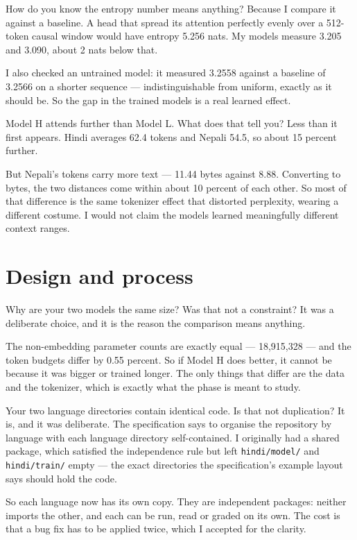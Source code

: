 \documentclass[11pt]{report}
\newcommand{\p}[1]{\texttt{#1}}
\begin{document}
\begin{qabox}{How do you know the entropy number means anything?}
Because I compare it against a baseline. A head that spread its attention
perfectly evenly over a 512-token causal window would have entropy 5.256 nats. My
models measure 3.205 and 3.090, about 2 nats below that.

I also checked an untrained model: it measured 3.2558 against a baseline of
3.2566 on a shorter sequence --- indistinguishable from uniform, exactly as it
should be. So the gap in the trained models is a real learned effect.
\end{qabox}

\begin{qabox}{Model H attends further than Model L. What does that tell you?}
Less than it first appears. Hindi averages 62.4 tokens and Nepali 54.5, so about
15 percent further.

But Nepali's tokens carry more text --- 11.44 bytes against 8.88. Converting to
bytes, the two distances come within about 10 percent of each other. So most of
that difference is the same tokenizer effect that distorted perplexity, wearing a
different costume. I would not claim the models learned meaningfully different
context ranges.
\end{qabox}

\section{Design and process}

\begin{qabox}{Why are your two models the same size? Was that not a constraint?}
It was a deliberate choice, and it is the reason the comparison means anything.

The non-embedding parameter counts are exactly equal --- 18,915,328 --- and the
token budgets differ by 0.55 percent. So if Model H does better, it cannot be
because it was bigger or trained longer. The only things that differ are the data
and the tokenizer, which is exactly what the phase is meant to study.
\end{qabox}

\begin{qabox}{Your two language directories contain identical code. Is that not duplication?}
It is, and it was deliberate. The specification says to organise the repository by
language with each language directory self-contained. I originally had a shared
package, which satisfied the independence rule but left \p{hindi/model/} and
\p{hindi/train/} empty --- the exact directories the specification's example layout
says should hold the code.

So each language now has its own copy. They are independent packages: neither
imports the other, and each can be run, read or graded on its own. The cost is
that a bug fix has to be applied twice, which I accepted for the clarity.
\end{qabox}
\end{document}
